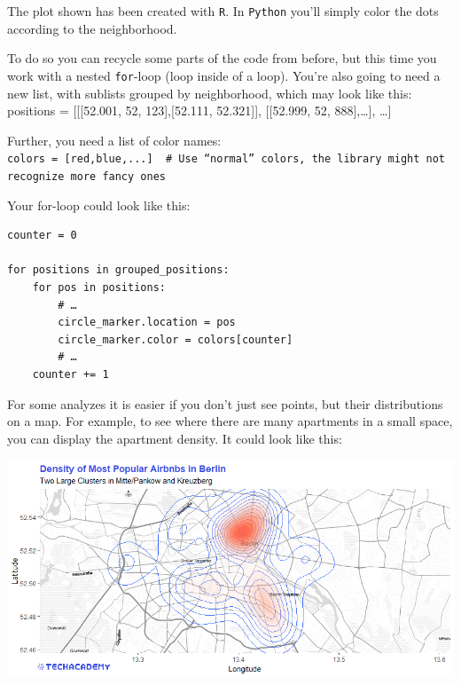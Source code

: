 \documentclass[
  11pt,
]{article}
\newenvironment{tipsp}[1]
  {
  \begin{itemize}
  \footnotesize
  \renewcommand{\labelitemi}{
    \raisebox{-.7\height}[0pt][0pt]{
      {\setkeys{Gin}{width=3em,keepaspectratio}
        \texttt{[image: images/\#1.png]}}
    }
  }
  \setlength{\fboxsep}{1em}
  \begin{pbox}
  \item
  }
  {
  \end{pbox}
  \end{itemize}
  }
\begin{document}
\begin{tipsp}p

The plot shown has been created with \texttt{R}. In \texttt{Python} you'll simply color the dots according to the neighborhood.

To do so you can recycle some parts of the code from before, but this time you work with a nested \texttt{for}-loop (loop inside of a loop).
You're also going to need a new list, with sublists grouped by neighborhood, which may look like this:
positions = {[}{[}{[}52.001, 52, 123{]},{[}52.111, 52.321{]}{]}, {[}{[}52.999, 52, 888{]},\ldots{]}, \ldots{]}

Further, you need a list of color names:
\texttt{colors\ =\ {[}\textquotesingle{}red\textquotesingle{},\textquotesingle{}blue\textquotesingle{},...{]}\ \ \#\ Use\ “normal”\ colors,\ the\ library\ might\ not\ recognize\ more\ fancy\ ones}

Your for-loop could look like this:

\begin{verbatim}
counter = 0
 
for positions in grouped_positions:
    for pos in positions:
        # …
        circle_marker.location = pos
        circle_marker.color = colors[counter]
        # …
    counter += 1
\end{verbatim}

\end{tipsp}

For some analyzes it is easier if you don't just see points, but their distributions on a map. For example, to see where there are many apartments in a small space, you can display the apartment density. It could look like this:

\begin{center}\includegraphics[width=1\linewidth]{plot/4_3_map_top200_density} \end{center}
\end{document}
